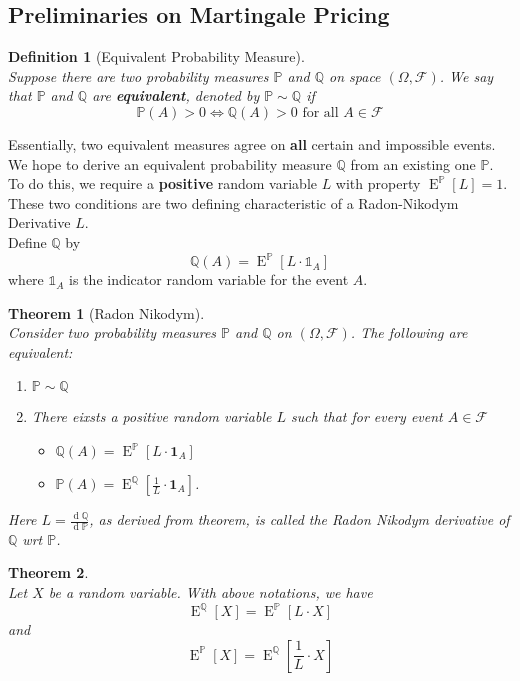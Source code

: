 \documentclass[12pt]{article}
\newtheorem{definition}{Definition}[section]
\newtheorem{theorem}{Theorem}[section]
\theoremstyle{definition}
\DeclareMathOperator{\diff}{d}
\DeclareMathOperator{\expec}{E}
\begin{document}
\subsection{Preliminaries on Martingale Pricing}
\begin{definition}[Equivalent Probability Measure]
\hfill\\\normalfont Suppose there are two probability measures $\mathbb{P}$ and $\mathbb{Q}$ on space $(\Omega, \mathcal{F})$. We say that $\mathbb{P}$ and $\mathbb{Q}$ are \textbf{equivalent}, denoted by $\mathbb{P}\sim \mathbb{Q}$ if
\[
\mathbb{P}(A)>0\Leftrightarrow \mathbb{Q}(A)>0\text{  for all }A\in\mathcal{F}
\]
\end{definition}
Essentially, two equivalent measures agree on \textbf{all} certain and impossible events.\\
We hope to derive an equivalent probability measure $\mathbb{Q}$ from an existing one $\mathbb{P}$. To do this, we require a \textbf{positive} random variable $L$ with property $\expec^{\mathbb{P}}[L]=1$. These two conditions are two defining characteristic of a Radon-Nikodym Derivative $L$.\\
Define $\mathbb{Q}$ by
\[
\mathbb{Q}(A)=\expec^{\mathbb{P}}[L\cdot \mathbb{1}_A]
\]
where $\mathbb{1}_A$ is the indicator random variable for the event $A$.
\begin{theorem}[Radon Nikodym]
\hfill\\\normalfont Consider two probability measures $\mathbb{P}$ and $\mathbb{Q}$ on $(\Omega, \mathcal{F})$. The following are equivalent:
\begin{enumerate}
  \item $\mathbb{P}\sim\mathbb{Q}$
  \item There eixsts a positive random variable $L$ such that for every event $A\in\mathcal{F}$
  \begin{itemize}
    \item $\mathbb{Q}(A)=\expec^\mathbb{P}[L\cdot \mathbf{1}_A]$
    \item $\mathbb{P}(A)=\expec^\mathbb{Q}[\frac{1}{L}\cdot \mathbf{1}_A]$.
  \end{itemize}
\end{enumerate}
Here $L=\frac{\diff \mathbb{Q}}{\diff \mathbb{P}}$, as derived from theorem, is called the Radon Nikodym derivative of $\mathbb{Q}$ wrt $\mathbb{P}$.
\end{theorem}
\begin{theorem}
\hfill\\\normalfont Let $X$ be a random variable. With above notations, we have
\[
\expec^\mathbb{Q}[X]=\expec^\mathbb{P}[L\cdot X]
\]
and
\[
\expec^\mathbb{P}[X]=\expec^\mathbb{Q}[\frac{1}{L}\cdot X]
\]
\end{theorem}
\end{document}
